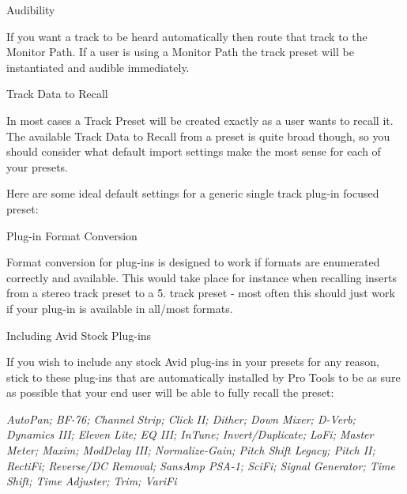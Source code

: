  
\begin{DoxyItemize}
\item Audibility


\begin{DoxyItemize}
\item If you want a track to be heard automatically then route that track to the Monitor Path. If a user is using a Monitor Path the track preset will be instantiated and audible immediately.  
\end{DoxyItemize}
\item Track Data to Recall


\begin{DoxyItemize}
\item In most cases a Track Preset will be created exactly as a user wants to recall it. The available Track Data to Recall from a preset is quite broad though, so you should consider what default import settings make the most sense for each of your presets.

Here are some ideal default settings for a generic single track plug-\/in focused preset\+:

   
\end{DoxyItemize}
\item Plug-\/in Format Conversion


\begin{DoxyItemize}
\item Format conversion for plug-\/ins is designed to work if formats are enumerated correctly and available. This would take place for instance when recalling inserts from a stereo track preset to a 5. track preset -\/ most often this should just work if your plug-\/in is available in all/most formats.  
\end{DoxyItemize}
\item Including Avid Stock Plug-\/ins


\begin{DoxyItemize}
\item If you wish to include any stock Avid plug-\/ins in your presets for any reason, stick to these plug-\/ins that are automatically installed by Pro Tools to be as sure as possible that your end user will be able to fully recall the preset\+:


\begin{DoxyItemize}
\item {\itshape Auto\+Pan; B\+F-\/76; Channel Strip; Click II; Dither; Down Mixer; D-\/\+Verb; Dynamics I\+II; Eleven Lite; EQ I\+II; In\+Tune; Invert/\+Duplicate; Lo\+Fi; Master Meter; Maxim; Mod\+Delay I\+II; Normalize-\/\+Gain; Pitch Shift Legacy; Pitch II; Recti\+Fi; Reverse/\+DC Removal; Sans\+Amp P\+S\+A-\/1; Sci\+Fi; Signal Generator; Time Shift; Time Adjuster; Trim; Vari\+Fi}  
\end{DoxyItemize}


\end{DoxyItemize}
\end{DoxyItemize}
